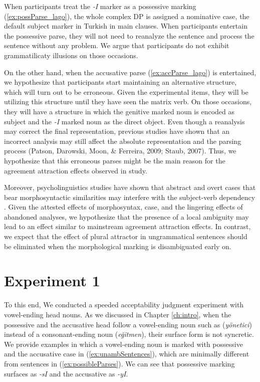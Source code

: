 When participants treat the {\emph{-I}} marker as a possessive marking (\ref{ex:possParse_lago}), the whole complex DP is assigned a nominative case, the default subject marker in Turkish in main clauses. When participants entertain the possessive parse, they will not need to reanalyze the sentence and process the sentence without any problem. We argue that participants do not exhibit grammatilicaty illusions on those occasions. 

On the other hand, when the accusative parse (\ref{ex:accParse_lago}) is entertained, we hypothesize that participants start maintaining an alternative structure, which will turn out to be erroneous. Given the experimental items, they will be utilizing this structure until they have seen the matrix verb. On those occasions, they will have a structure in which the genitive marked noun is encoded as subject and the \emph{-I} marked noun as the direct object. Even though a reanalysis may correct the final representation, previous studies have shown that an incorrect analysis may still affect the absolute representation and the parsing process (Patson, Darowski, Moon, \& Ferreira, 2009; Staub, 2007). Thus, we hypothesize that this erroneous parses might be the main reason for the agreement attraction effects observed in \cites{LagoEtAl2019} study.

Moreover, psycholinguistics studies have shown that abstract and overt cases that bear morphosyntactic similarities may interfere with the subject-verb dependency \citep{Slioussar2018,ArnettWagers:2017,LogacevVasishth2012}. Given the attested effects of morphosyntax, case, and the lingering effects of abandoned analyses, we hypothesize that the presence of a local ambiguity may lead to an effect similar to mainstream agreement attraction effects. In contrast, we expect that the effect of plural attractor in ungrammatical sentences should be eliminated when the morphological marking is disambiguated early on.

\section{Experiment 1}

To this end, We conducted a speeded acceptability judgment experiment with vowel-ending head nouns. As we discussed in Chapter \ref{ch:intro}, when the possessive and the accusative head follow a vowel-ending noun such as (\emph{y\"onetici}) instead of a consonant-ending noun (\emph{e\u{g}itmen}), their surface form is not syncretic. We provide examples in which a vowel-ending noun is marked with possessive and the accusative case in (\ref{ex:unambSentences}), which are minimally different from sentences in (\ref{ex:possibleParses}). We can see that possessive marking surfaces as {\emph{-sI}} and the accusative as {\emph{-yI}}.

